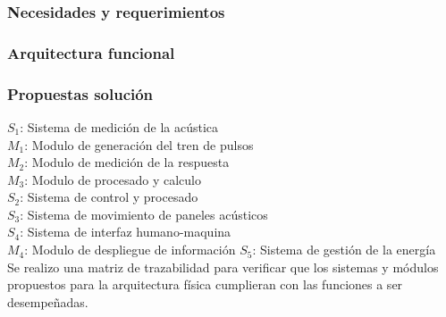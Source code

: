 \subsubsection{Necesidades y requerimientos}
\subsubsection{Arquitectura funcional}
\subsubsection{Propuestas solución}

$S_{1}$: Sistema de medición de la acústica \\
\tab    $M_{1}$: Modulo de generación del tren de pulsos \\
\tab    $M_{2}$: Modulo de medición de la respuesta \\
\tab    $M_{3}$: Modulo de procesado y calculo \\
$S_{2}$: Sistema de control y procesado \\
$S_{3}$: Sistema de movimiento de paneles acústicos \\
$S_{4}$: Sistema de interfaz humano-maquina \\
\tab    $M_{4}$: Modulo de despliegue de información
$S_{5}$: Sistema de gestión de la energía \\

Se realizo una matriz de trazabilidad para verificar que los sistemas y módulos propuestos para la arquitectura física cumplieran con las funciones a ser desempeñadas.
